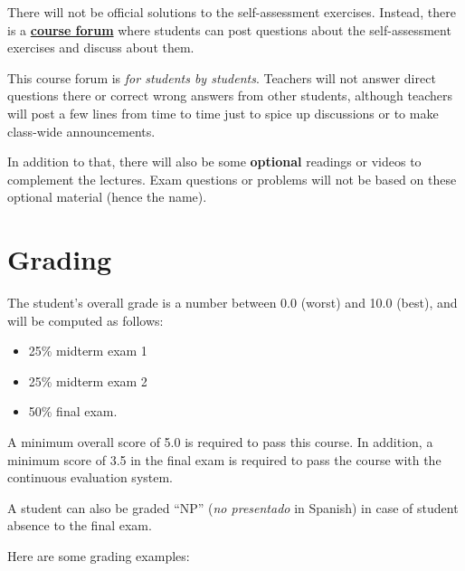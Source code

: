 \documentclass[11pt, a4paper, twoside]{article}
\begin{document}
There will not be official solutions to the self-assessment exercises. Instead,
there is a
\textbf{\href{https://aulaglobal.uc3m.es/mod/forum/view.php?id=555369}{course
forum}} where students can post questions about the self-assessment exercises
and discuss about them.

This course forum is \emph{for students by students}. Teachers will not answer
direct questions there or correct wrong answers from other students, although
teachers will post a few lines from time to time just to spice up discussions
or to make class-wide announcements.

In addition to that, there will also be some \textbf{optional} readings or
videos to complement the lectures. Exam questions or problems will not be based on these optional material (hence the name).

\section{Grading}

The student's overall grade is a number between 0.0 (worst) and 10.0 (best),
and will be computed as follows:

\begin{itemize}

  \item 25\% midterm exam 1

  \item 25\% midterm exam 2

  \item 50\% final exam.

\end{itemize}

A minimum overall score of 5.0 is required to pass this course. In addition,
a minimum score of 3.5 in the final exam is required to pass
the course with the continuous evaluation system.

A student can also be graded ``NP'' (\emph{no presentado} in Spanish) in case
of student absence to the final exam.

Here are some grading examples:
\end{document}
